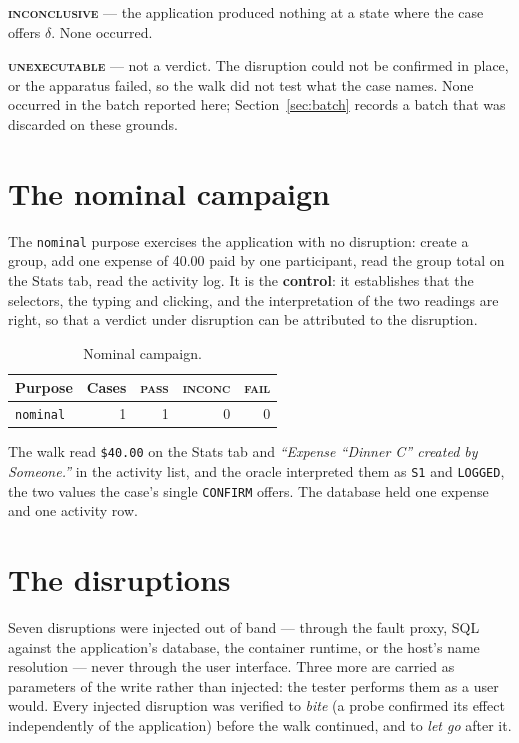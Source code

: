 \documentclass[11pt,a4paper]{article}
\newcommand{\gate}[1]{\texttt{\small #1}}
\begin{document}
\noindent\textbf{\textsc{inconclusive}} --- the application produced nothing at a
state where the case offers $\delta$. None occurred.

\noindent\textbf{\textsc{unexecutable}} --- not a verdict. The disruption could
not be confirmed in place, or the apparatus failed, so the walk did not test what
the case names. None occurred in the batch reported here; Section~\ref{sec:batch}
records a batch that was discarded on these grounds.

\section{The nominal campaign}

The \gate{nominal} purpose exercises the application with no disruption: create
a group, add one expense of 40.00 paid by one participant, read the group total
on the Stats tab, read the activity log. It is the \textbf{control}: it
establishes that the selectors, the typing and clicking, and the interpretation
of the two readings are right, so that a verdict under disruption can be
attributed to the disruption.

\begin{table}[h]
\centering\small
\caption{Nominal campaign.}
\begin{tabular}{@{}lrrrr@{}}
\toprule
Purpose & Cases & \textsc{pass} & \textsc{inconc} & \textsc{fail} \\
\midrule
\gate{nominal} & 1 & 1 & 0 & 0 \\
\bottomrule
\end{tabular}
\end{table}

\noindent The walk read \texttt{\$40.00} on the Stats tab and \emph{``Expense
``Dinner C'' created by Someone.''} in the activity list, and the oracle
interpreted them as \gate{S1} and \gate{LOGGED}, the two values the case's single
\gate{CONFIRM} offers. The database held one expense and one activity row.

\section{The disruptions}

Seven disruptions were injected out of band --- through the fault proxy, SQL
against the application's database, the container runtime, or the host's name
resolution --- never through the user interface. Three more are carried as
parameters of the write rather than injected: the tester performs them as a user
would. Every injected disruption was verified to \emph{bite} (a probe confirmed
its effect independently of the application) before the walk continued, and to
\emph{let go} after it.
\end{document}
